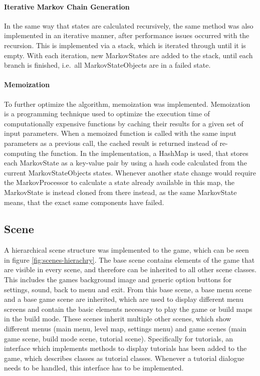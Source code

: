 \paragraph{Iterative Markov Chain Generation}
In the same way that states are calculated recursively, the same method was also implemented in an iterative manner,
after performance issues occurred with the recursion.
This is implemented via a stack, which is iterated through until it is empty.
With each iteration, new MarkovStates are added to the stack, until each branch is finished, i.e.\ all MarkovStateObjects are in a failed state.
\paragraph{Memoization}
To further optimize the algorithm, memoization was implemented.
Memoization is a programming technique used to optimize the execution time of computationally expensive functions by caching their results for a given set of input parameters.
When a memoized function is called with the same input parameters as a previous call, the cached result is returned instead of re-computing the function.
In the implementation, a HashMap is used, that stores each MarkovState as a key-value pair by using a hash code calculated from the current MarkovStateObjects states.
Whenever another state change would require the MarkovProcessor to calculate a state already available in this map, the MarkovState is instead cloned from there instead,
as the same MarkovState means, that the exact same components have failed.

\subsection{Scene}\label{subsec:scenes}
A hierarchical scene structure was implemented to the game, which can be seen in figure \ref{fig:scenes-hierachry}.
The base scene contains elements of the game that are visible in every scene, and therefore can be inherited to all other scene classes.
This includes the games background image and generic option buttons for settings, sound, back to menu and exit.
From this base scene, a base menu scene and a base game scene are inherited, which are used to display different menu screens and contain
the basic elements necessary to play the game or build maps in the build mode.
These scenes inherit multiple other scenes, which show different menus (main menu, level map, settings menu) and game scenes (main game scene, build mode scene, tutorial scene).
Specifically for tutorials, an interface which implements methods to display tutorials has been added to the game, which describes classes as tutorial classes.
Whenever a tutorial dialogue needs to be handled, this interface has to be implemented.


